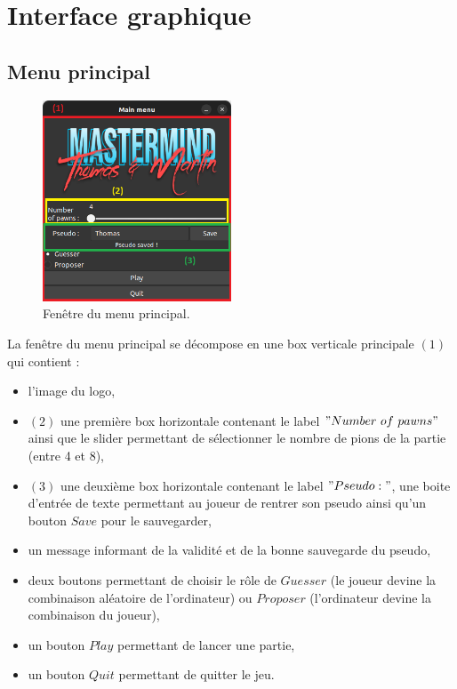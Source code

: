 \newpage
\section{Interface graphique}

\subsection{Menu principal}

\begin{figure}[htbp]
    \centering
    \includegraphics[width=0.5\textwidth]{main_menu.png}
    \caption{Fenêtre du menu principal.}
\end{figure}

La fenêtre du menu principal se décompose en une box verticale principale $(1)$ qui contient :
\begin{itemize}
    \item l'image du logo,
    \item $(2)$ une première box horizontale contenant le label $"Number~of~ pawns"$ ainsi que le slider permettant de sélectionner le nombre de pions de la partie (entre 4 et 8),
    \item $(3)$ une deuxième box horizontale contenant le label $"Pseudo:"$, une boite d'entrée de texte permettant au joueur de rentrer son pseudo ainsi qu'un bouton $Save$ pour le sauvegarder,
    \item un message informant de la validité et de la bonne sauvegarde du pseudo,
    \item deux boutons permettant de choisir le rôle de $Guesser$ (le joueur devine la combinaison aléatoire de l'ordinateur) ou $Proposer$ (l'ordinateur devine la combinaison du joueur),
    \item un bouton $Play$ permettant de lancer une partie,
    \item un bouton $Quit$ permettant de quitter le jeu.
\end{itemize}

